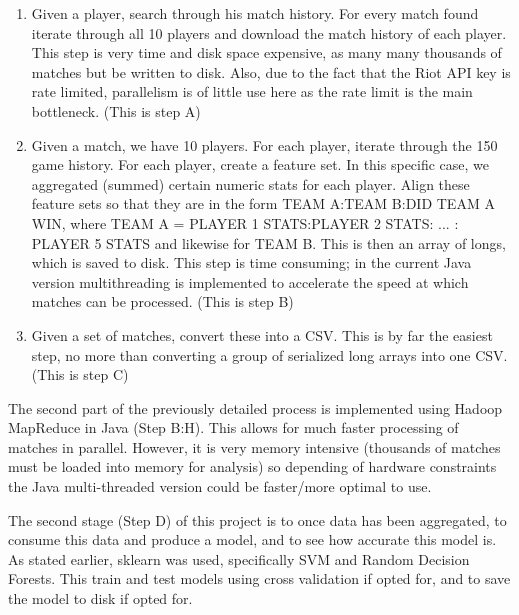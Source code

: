 \begin{enumerate}
\item Given a player, search through his match history. For every match found iterate through all 10 players and download the match history of each player. This step is very time and disk space expensive, as many many thousands of matches but be written to disk. Also, due to the fact that the Riot API key is rate limited, parallelism is of little use here as the rate limit is the main bottleneck. (This is step A)
\item Given a match, we have 10 players. For each player, iterate through the 150 game history. For each player, create a feature set. In this specific case, we aggregated (summed) certain numeric stats for each player. Align these feature sets so that they are in the form TEAM A:TEAM B:DID TEAM A WIN, where TEAM A = PLAYER 1 STATS:PLAYER 2 STATS: ... : PLAYER 5 STATS and likewise for TEAM B. This is then an array of longs, which is saved to disk. This step is time consuming; in the current Java version multithreading is implemented to accelerate the speed at which matches can be processed. (This is step B)
\item Given a set of matches, convert these into a CSV. This is by far the easiest step, no more than converting a group of serialized long arrays into one CSV. (This is step C)

\end{enumerate}

The second part of the previously detailed process is implemented using Hadoop MapReduce in Java (Step B:H). This allows for much faster processing of matches in parallel. However, it is very memory intensive (thousands of matches must be loaded into memory for analysis) so depending of hardware constraints 
the Java multi-threaded version could be faster/more optimal to use. 

The second stage (Step D) of this project is to once data has been aggregated, to consume this data and produce a model, and to see how accurate this model is. As stated earlier, sklearn was used, specifically SVM and Random Decision Forests. This train and test models using cross validation if opted for, and to save the model to disk if opted for. 

